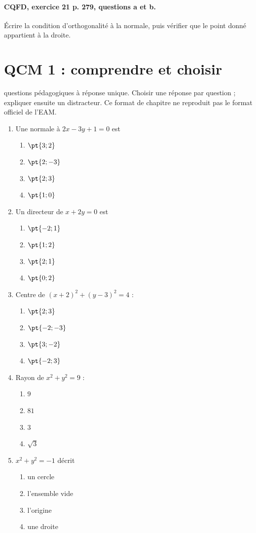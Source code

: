\paragraph{CQFD, exercice 21 p. 279, questions a et b.}\label{C07-M2} Écrire la condition d’orthogonalité à la normale, puis vérifier que le point donné appartient à la droite.
\begingroup\small
\mxnewpage\section*{QCM 1 : comprendre et choisir}\label{C07-Q1}
 questions pédagogiques à réponse unique. Choisir une réponse par question ; expliquer ensuite un distracteur. Ce format de chapitre ne reproduit pas le format officiel de l’EAM.
\begin{enumerate}
\item Une normale à $2x-3y+1=0$ est
\begin{enumerate}[label=\Alph*.,itemsep=2pt]
\item $\pt{3;2}$
\item $\pt{2;-3}$
\item $\pt{2;3}$
\item $\pt{1;0}$
\end{enumerate}
\item Un directeur de $x+2y=0$ est
\begin{enumerate}[label=\Alph*.,itemsep=2pt]
\item $\pt{-2;1}$
\item $\pt{1;2}$
\item $\pt{2;1}$
\item $\pt{0;2}$
\end{enumerate}
\item Centre de $(x+2)^2+(y-3)^2=4$ :
\begin{enumerate}[label=\Alph*.,itemsep=2pt]
\item $\pt{2;3}$
\item $\pt{-2;-3}$
\item $\pt{3;-2}$
\item $\pt{-2;3}$
\end{enumerate}
\item Rayon de $x^2+y^2=9$ :
\begin{enumerate}[label=\Alph*.,itemsep=2pt]
\item $9$
\item $81$
\item $3$
\item $\sqrt3$
\end{enumerate}
\item $x^2+y^2=-1$ décrit
\begin{enumerate}[label=\Alph*.,itemsep=2pt]
\item un cercle
\item l’ensemble vide
\item l’origine
\item une droite
\end{enumerate}
\end{enumerate}
